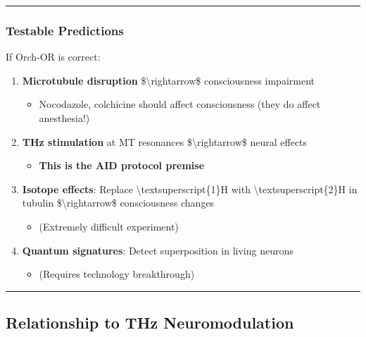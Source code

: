\begin{center}\rule{0.5\linewidth}{0.5pt}\end{center}

\subsubsection{Testable Predictions}\label{testable-predictions}

If Orch-OR is correct:

\begin{enumerate}
\def\labelenumi{\arabic{enumi}.}
\tightlist
\item
  \textbf{Microtubule disruption} \$\textbackslash rightarrow\$
  consciousness impairment

  \begin{itemize}
  \tightlist
  \item
    Nocodazole, colchicine should affect consciousness (they do affect
    anesthesia!)
  \end{itemize}
\item
  \textbf{THz stimulation} at MT resonances
  \$\textbackslash rightarrow\$ neural effects

  \begin{itemize}
  \tightlist
  \item
    \textbf{This is the AID protocol premise}
  \end{itemize}
\item
  \textbf{Isotope effects}: Replace \textbackslash textsuperscript\{1\}H
  with \textbackslash textsuperscript\{2\}H in tubulin
  \$\textbackslash rightarrow\$ consciousness changes

  \begin{itemize}
  \tightlist
  \item
    (Extremely difficult experiment)
  \end{itemize}
\item
  \textbf{Quantum signatures}: Detect superposition in living neurons

  \begin{itemize}
  \tightlist
  \item
    (Requires technology breakthrough)
  \end{itemize}
\end{enumerate}

\begin{center}\rule{0.5\linewidth}{0.5pt}\end{center}

\subsection{Relationship to THz
Neuromodulation}\label{relationship-to-thz-neuromodulation}

